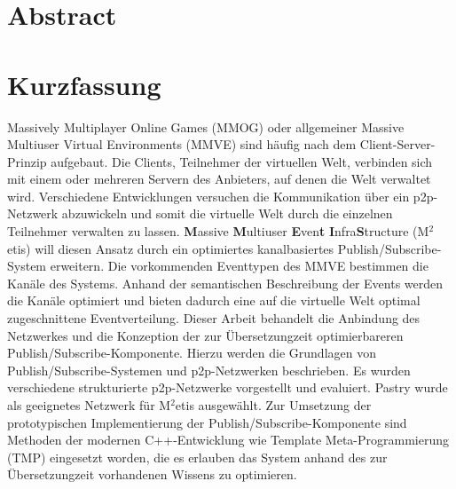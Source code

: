 \chapter*{Abstract}


\clearpage{\pagestyle{empty}\cleardoublepage}
\chapter*{Kurzfassung}

Massively Multiplayer Online Games (MMOG) oder allgemeiner Massive Multiuser Virtual Environments (MMVE) sind häufig nach dem Client-Server-Prinzip aufgebaut. Die Clients, Teilnehmer der virtuellen Welt, verbinden sich mit einem oder mehreren Servern des Anbieters, auf denen die Welt verwaltet wird. Verschiedene Entwicklungen versuchen die Kommunikation über ein p2p-Netzwerk abzuwickeln und somit die virtuelle Welt durch die einzelnen Teilnehmer verwalten zu lassen. \textbf{M}assive \textbf{M}ultiuser \textbf{E}ven\textbf{t} \textbf{I}nfra\textbf{S}tructure (M$^2$etis) will diesen Ansatz durch ein optimiertes kanalbasiertes Publish/Subscribe-System erweitern. Die vorkommenden Eventtypen des MMVE bestimmen die Kanäle des Systems. Anhand der semantischen Beschreibung der Events werden die Kanäle optimiert und bieten dadurch eine auf die virtuelle Welt optimal zugeschnittene Eventverteilung. Dieser Arbeit behandelt die Anbindung des Netzwerkes und die Konzeption der zur Übersetzungzeit optimierbareren Publish/Subscribe-Komponente. Hierzu werden die Grundlagen von Publish/Subscribe-Systemen und p2p-Netzwerken beschrieben. Es wurden verschiedene strukturierte p2p-Netzwerke vorgestellt und evaluiert. Pastry wurde als geeignetes Netzwerk für M$^2$etis ausgewählt. Zur Umsetzung der prototypischen Implementierung der Publish/Subscribe-Komponente sind Methoden der modernen C++-Entwicklung wie Template Meta-Programmierung (TMP) eingesetzt worden, die es erlauben das System anhand des zur Übersetzungzeit vorhandenen Wissens zu optimieren.


